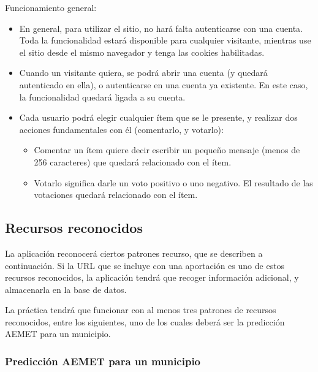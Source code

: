 Funcionamiento general:

\begin{itemize}
\item En general, para utilizar el sitio, no hará falta autenticarse con una cuenta. Toda la funcionalidad estará disponible para cualquier visitante, mientras use el sitio desde el mismo navegador y tenga las cookies habilitadas.

\item Cuando un visitante quiera, se podrá abrir una cuenta (y quedará autenticado en ella), o autenticarse en una cuenta ya existente. En este caso, la funcionalidad quedará ligada a su cuenta.
  
\item Cada usuario podrá elegir cualquier ítem que se le presente, y realizar dos acciones fundamentales con él (comentarlo, y votarlo):
  \begin{itemize}
  \item Comentar un ítem quiere decir escribir un pequeño mensaje (menos de 256 caracteres) que quedará relacionado con el ítem.
  \item Votarlo significa darle un voto positivo o uno negativo. El resultado de las votaciones quedará relacionado con el ítem.
  \end{itemize}

\end{itemize}


\subsection{Recursos reconocidos}
\label{sec:practica-final-2021-05:reconocidos}

La aplicación reconocerá ciertos patrones recurso, que se describen a continuación. Si la URL que se incluye con una aportación es uno de estos recursos reconocidos, la aplicación tendrá que recoger información adicional, y almacenarla en la base de datos.

La práctica tendrá que funcionar con al menos tres patrones de recursos reconocidos, entre los siguientes, uno de los cuales deberá ser la predicción AEMET para un municipio.

\subsubsection{Predicción AEMET para un municipio}

